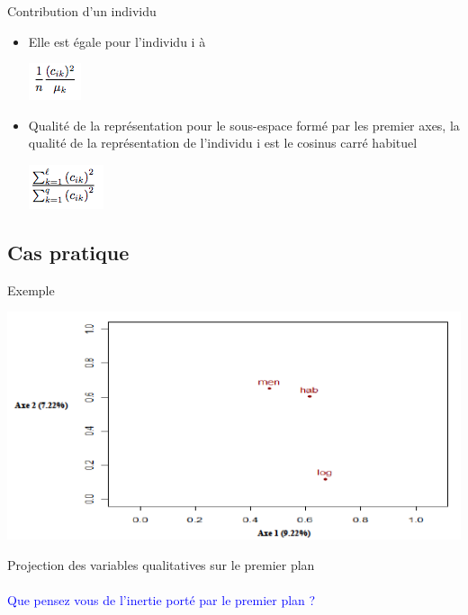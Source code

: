 \documentclass[10pt]{beamer}
\begin{document}

\begin{frame}{ Contribution d’un individu }
 
 \begin{itemize}
 
 \centering  
 \item   Elle est égale pour l'individu i à 
 
 \includegraphics[scale=.8]{AFC12} 


\item Qualité de la représentation pour le sous-espace formé
par les  premier axes, la qualité de la représentation de
l'individu i est le cosinus carré habituel
   
    \includegraphics[scale=.8]{AFC13} 
 \end{itemize}
 
 
\end{frame}

\subsection{Cas pratique}
\begin{frame}{Exemple}

 \includegraphics[scale=.5]{ACM1} 


\centering Projection des variables qualitatives sur le premier plan\\~\\

\textcolor{blue}{Que pensez vous de l'inertie porté par le premier plan ?}

\end{frame}
\end{document}

